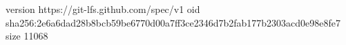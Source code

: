 version https://git-lfs.github.com/spec/v1
oid sha256:2e6a6dad28b8bcb59be6770d00a7ff3ce2346d7b2fab177b2303acd0e98e8fe7
size 11068
